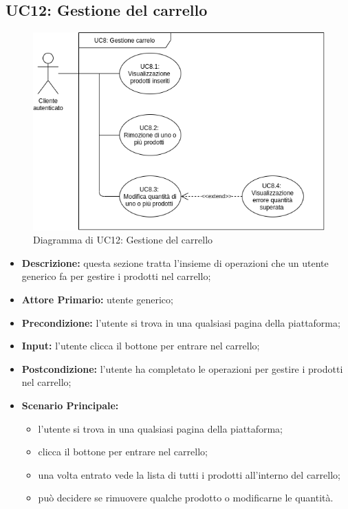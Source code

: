\subsection{UC12: Gestione del carrello}
        \begin{figure}[!ht]
            \caption{Diagramma di UC12: Gestione del carrello}
            \vspace{10px}
            \includegraphics[scale=0.5]{../../../Images/AnalisiRequisiti/UC8}
            \centering
        \end{figure}
        \begin{itemize}
            \item \textbf{Descrizione:} questa sezione tratta l'insieme di operazioni che un utente generico fa per gestire i prodotti nel carrello;
            \item \textbf{Attore Primario:} utente generico;
            \item \textbf{Precondizione:} l'utente si trova in una qualsiasi pagina della piattaforma;
            \item \textbf{Input:} l'utente clicca il bottone per entrare nel carrello;
            \item \textbf{Postcondizione:} l'utente ha completato le operazioni per gestire i prodotti nel carrello;
            \item \textbf{Scenario Principale:}
                \begin{itemize}
                    \item l'utente si trova in una qualsiasi pagina della piattaforma;
                    \item clicca il bottone per entrare nel carrello;
                    \item una volta entrato vede la lista di tutti i prodotti all'interno del carrello;
                    \item può decidere se rimuovere qualche prodotto o modificarne le quantità.
                \end{itemize}
        \end{itemize}
